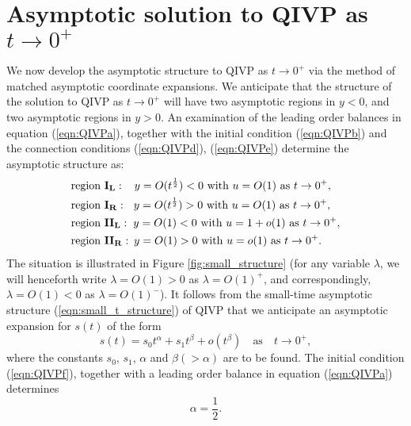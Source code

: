 \documentclass[11pt,a4paper]{article}
\newcommand{\eeref}[1]{(\ref{eqn:#1})}
\newcommand{\eelab}[1]{\label{eqn:#1}}
\newcommand{\ffref}[1]{\ref{fig:#1}}
\newcommand{\sslab}[1]{\label{sec:#1}}
\def\beq{\begin{equation}}
\def\eeq{\end{equation}}
\begin{document}

\section{Asymptotic solution  to QIVP as $t \to 0^+$} \sslab{small_time}




We now develop the asymptotic structure to QIVP as $t \to 0^+$ via the method of matched asymptotic coordinate expansions. We anticipate that the structure of the solution to QIVP as $t \to 0^+$ will have two asymptotic regions in $y<0$, and two asymptotic regions in $y>0$. An examination of the leading order balances in equation \eeref{QIVPa}, together with the initial condition \eeref{QIVPb} and the connection conditions \eeref{QIVPd}, \eeref{QIVPe} determine the asymptotic structure as: 
\begin{subequations} \eelab{small_t_structure}
 \begin{align}
& \mbox{region $\mathbf{I_L}$}:  \hspace{0.3cm}  y = O(t^{\frac{1}{2}}) < 0 \mbox{ with }  u=O(1) \mbox{  as  } t \to 0^+,  \eelab{region_1l}  \\
& \mbox{region $\mathbf{I_R}$}:   \hspace{0.23cm} y = O(t^{\frac{1}{2}}) > 0 \mbox{ with }  u=O(1) \mbox{  as  } t \to 0^+, \eelab{region_1r} \\
& \mbox{region $\mathbf{II_L}$}:  \hspace{0.1cm}  y = O(1) < 0 \mbox{ with }  u=1+o(1) \mbox{  as  } t \to 0^+, \eelab{region_2l}  \\
& \mbox{region $\mathbf{II_R}$}:  \hspace{0.07cm}  y = O(1) > 0 \mbox{ with }  u=o(1) \mbox{  as  } t \to 0^+.   \eelab{region_2r}
\end{align}
\end{subequations}
 The situation is illustrated in Figure \ffref{small_structure} (for any variable $\lambda$, we will henceforth write $\lambda=O(1)>0$ as $\lambda=O(1)^+$, and correspondingly, $\lambda=O(1)<0$ as $\lambda=O(1)^-$). It follows from the small-time asymptotic structure \eeref{small_t_structure} of QIVP that we anticipate an asymptotic expansion for $s(t)$ of the form 
\beq \eelab{exp_small_s}
s(t) = s_0 t^{\alpha}  + s_1 t^{\beta} + o(t^{\beta})  \quad \mbox{as} \quad  t \to 0^+, 
\eeq
where the constants $s_0$, $s_1$, $\alpha$ and $\beta(>\alpha)$ are to be found. The initial condition \eeref{QIVPf}, together with a leading order  balance in equation \eeref{QIVPa} determines
\beq
\alpha=\frac{1}{2}.
\eeq
\end{document}
